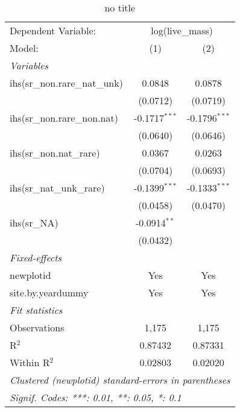 
\begin{table}[htbp]
   \caption{no title}
   \centering
   \begin{tabular}{lcc}
      \tabularnewline \midrule \midrule
      Dependent Variable: & \multicolumn{2}{c}{log(live\_mass)}\\
      Model:                         & (1)             & (2)\\  
      \midrule
      \emph{Variables}\\
      ihs(sr\_non.rare\_nat\_unk)    & 0.0848          & 0.0878\\   
                                     & (0.0712)        & (0.0719)\\   
      ihs(sr\_non.rare\_non.nat)     & -0.1717$^{***}$ & -0.1796$^{***}$\\   
                                     & (0.0640)        & (0.0646)\\   
      ihs(sr\_non.nat\_rare)         & 0.0367          & 0.0263\\   
                                     & (0.0704)        & (0.0693)\\   
      ihs(sr\_nat\_unk\_rare)        & -0.1399$^{***}$ & -0.1333$^{***}$\\   
                                     & (0.0458)        & (0.0470)\\   
      ihs(sr\_NA)                    & -0.0914$^{**}$  &   \\   
                                     & (0.0432)        &   \\   
      \midrule
      \emph{Fixed-effects}\\
      newplotid                      & Yes             & Yes\\  
      site.by.yeardummy              & Yes             & Yes\\  
      \midrule
      \emph{Fit statistics}\\
      Observations                   & 1,175           & 1,175\\  
      R$^2$                          & 0.87432         & 0.87331\\  
      Within R$^2$                   & 0.02803         & 0.02020\\  
      \midrule \midrule
      \multicolumn{3}{l}{\emph{Clustered (newplotid) standard-errors in parentheses}}\\
      \multicolumn{3}{l}{\emph{Signif. Codes: ***: 0.01, **: 0.05, *: 0.1}}\\
   \end{tabular}
\end{table}


